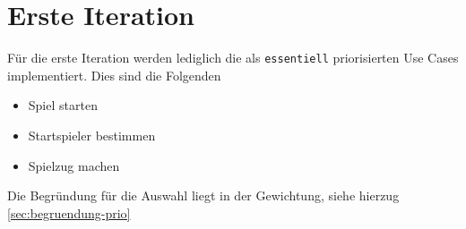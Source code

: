 \section{Erste Iteration}
Für die erste Iteration werden lediglich die als \texttt{essentiell} priorisierten Use Cases implementiert. Dies sind die Folgenden

\begin{itemize}
\item Spiel starten
\item Startspieler bestimmen
\item Spielzug machen
\end{itemize}

Die Begründung für die Auswahl liegt in der Gewichtung, siehe hierzug \ref{sec:begruendung-prio}
